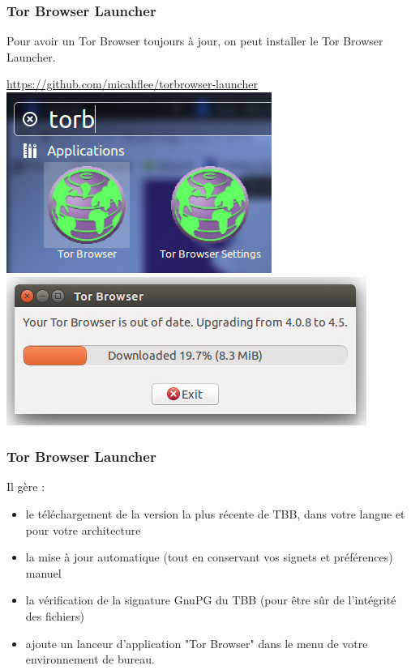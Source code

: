 \documentclass{beamer}
\begin{document}
\begin{frame}
\frametitle{Tor Browser Launcher}
Pour avoir un Tor Browser toujours à jour, on peut installer le Tor Browser Launcher.
\begin{center}
\url{https://github.com/micahflee/torbrowser-launcher}
\\ \includegraphics[scale=0.3]{./images/tor_browser01.jpg}
\\ \includegraphics[scale=0.3]{./images/tor_browser02.jpg}
\end{center}
\end{frame}
\begin{frame}
\frametitle{Tor Browser Launcher}
Il gère : 
\begin{itemize}
\item le téléchargement de la version la plus récente de TBB, dans votre langue et pour votre architecture
\item la mise à jour automatique (tout en conservant vos signets et préférences) manuel
\item la vérification de la signature GnuPG du TBB (pour être sûr de l’intégrité des fichiers)
\item ajoute un lanceur d’application "Tor Browser" dans le menu de votre environnement de bureau.
\end{itemize}
\end{frame}
\end{document}
